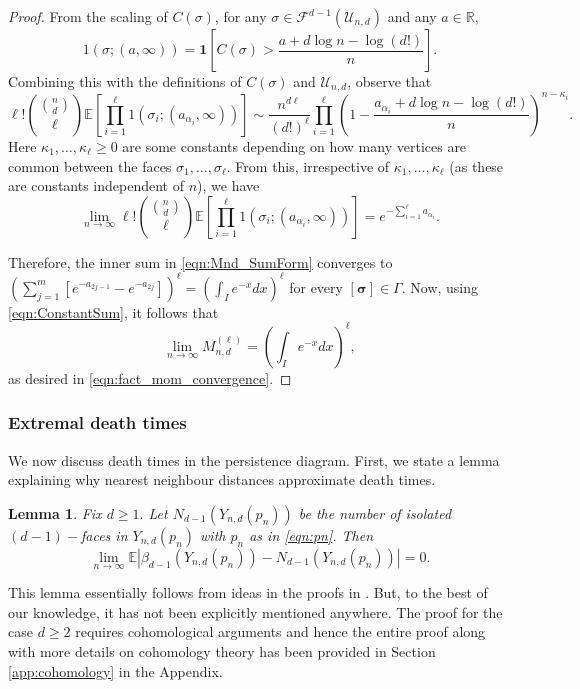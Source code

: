 \documentclass[12pt]{amsart}
\newcommand{\gt}[1]{\textcolor{blue}{#1}}
\renewcommand{\gt}[1]{#1}
\newtheorem{lemma}[theorem]{Lemma}
\numberwithin{equation}{section}
\numberwithin{theorem}{section}
\newcommand{\1}{\mathbf{1}}
\def\F{\mathcal{F}}
\def\U{\mathcal{U}}
\def\EP{\mathbb{E}}
\begin{document}
\begin{proof}
From the scaling of $C(\sigma)$, for any $\sigma \in \F^{d -
1}(\U_{n, d})$ and any $a \in \mathbb{R},$
%
\[
1(\sigma;(a, \infty)) = 		\1\left[C(\sigma) > \frac{a + d \log n - \log(d!)}{n}\right].
\]
%
Combining this with the definitions of $C(\sigma)$ and $\U_{n,d}$, observe that
\[
\ell ! \binom{\binom{n}{d}}{\ell} \mathbb{E}\left[\prod_{i = 1}^{\ell} 1(\sigma_i; (a_{\alpha_i},
\infty))\right] \sim \frac{n^{d \ell}}{\left(d!\right)^\ell} \prod_{i = 1}^{\ell} \left(1 - \frac{a_{\alpha_i} + d \log n - \log(d!)}{n} \right)^{n - \kappa_i}.
\]
Here $\kappa_1, \ldots, \kappa_\ell \geq 0$ are some constants depending on how many vertices are common between the faces $\sigma_1, \ldots, \sigma_\ell.$ From this, irrespective of $\kappa_1, \ldots, \kappa_{\ell}$ (as these are constants independent of $n$), we have
%		
\[
\lim_{n \to \infty} \ell ! \binom{\binom{n}{d}}{\ell} \mathbb{E}\left[\prod_{i = 1}^{\ell} 1(\sigma_i; (a_{\alpha_i},
\infty))\right]
=  e^{-\sum_{i = 1}^{\ell} a_{\alpha_i}}.
\]
%
\gt{
Therefore, the inner sum in \eqref{eqn:Mnd_SumForm} converges to $ \left(\sum_{j = 1}^{m} [e^{-a_{2j-1}} - e^{-a_{2j}}]\right)^{\ell} = \left(\int_{I} e^{-x} dx
\right)^{\ell}$ for every $[\pmb{\sigma}] \in \Gamma.$ Now, using \eqref{eqn:ConstantSum}, it follows that 
%
\[
\lim_{n \to \infty} M_{n, d}^{(\ell)} =  \left(\int_{I} e^{-x} dx
\right)^{\ell},	\]
%
as desired in \eqref{eqn:fact_mom_convergence}.}
%
\end{proof}


\subsubsection{Extremal death times}
\label{sec:death_times}

We now discuss death times in the persistence diagram. First, we state a lemma explaining why nearest neighbour distances approximate death times.
%
\begin{lemma}
\label{lem:ExpBettiIsoFaceZero}
%
Fix $d \geq 1.$ Let $N_{d - 1}(Y_{n, d}(p_n))$ be the number of isolated $(d - 1)-$faces in $Y_{n, d}(p_n)$ with $p_n$ as in \eqref{eqn:pn}. Then
\[
\lim_{n \to \infty} \EP|\beta_{d - 1}(Y_{n, d}(p_n)) - N_{d - 1}(Y_{n, d}(p_n))| = 0.
\]
\end{lemma}
%

This lemma essentially follows from ideas in the proofs in \cite[Theorem 1.10]{kahle2014inside}. But, to the best of our knowledge, it has not been explicitly mentioned anywhere. The proof for the case $d \geq 2$ requires cohomological arguments and hence the entire proof along with more details on cohomology theory has been provided \gt{in Section \ref{app:cohomology} in the Appendix}.
\end{document}
